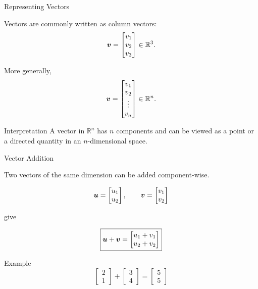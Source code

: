 
\begin{frame}{Representing Vectors}

Vectors are commonly written as column vectors:
\[
\bm{v}
=
\begin{bmatrix}
v_1\\
v_2\\
v_3
\end{bmatrix}
\in \mathbb{R}^3.
\]

More generally,
\[
\bm{v}
=
\begin{bmatrix}
v_1\\
v_2\\
\vdots\\
v_n
\end{bmatrix}
\in \mathbb{R}^n.
\]

\begin{block}{Interpretation}
A vector in $\mathbb{R}^n$ has $n$ components and can be viewed as a point or a directed quantity in an $n$-dimensional space.
\end{block}

\end{frame}



\begin{frame}{Vector Addition}

Two vectors of the same dimension can be added component-wise.

\[
\bm{u}
=
\begin{bmatrix}
u_1\\
u_2
\end{bmatrix},
\qquad
\bm{v}
=
\begin{bmatrix}
v_1\\
v_2
\end{bmatrix}
\]

give

\[
\boxed{
\bm{u}+\bm{v}
=
\begin{bmatrix}
u_1+v_1\\
u_2+v_2
\end{bmatrix}
}
\]

\vspace{0.4cm}

\begin{exampleblock}{Example}
\[
\begin{bmatrix}
2\\
1
\end{bmatrix}
+
\begin{bmatrix}
3\\
4
\end{bmatrix}
=
\begin{bmatrix}
5\\
5
\end{bmatrix}
\]
\end{exampleblock}

\end{frame}


